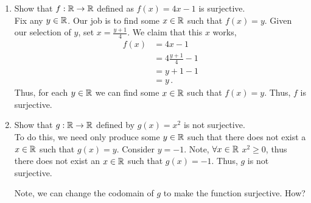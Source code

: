 \guard



\begin{exmp}
\label{exmp:easySurjectiveExamples}
  \begin{enumerate}
    \item Show that $f:\mathbb{R}\to\mathbb{R}$ defined as $f(x) = 4x-1$ is surjective.\\
    Fix any $y\in \mathbb{R}$.
    Our job is to find some $x\in\mathbb{R}$ such that $f(x)=y$.
    Given our selection of $y$, set $x = \frac{y+1}{4}$.
    We claim that this $x$ works,
    \begin{align*}
      f(x)  &=  4x-1 \\
            &=  4\frac{y+1}{4} - 1 \\
            &=  y+1 - 1 \\
            &=  y\,.
    \end{align*}
    Thus, for each $y\in\mathbb{R}$ we can find some $x\in\mathbb{R}$ such that $f(x)=y$.
    Thus, $f$ is surjective.

    \item Show that $g:\mathbb{R}\to\mathbb{R}$ defined by $g(x)=x^2$ is not surjective.\\
    To do this, we need only produce some $y\in\mathbb{R}$ such that there does not exist a $x\in\mathbb{R}$ such that $g(x)=y$.
    Consider $y=-1$.
    Note, $\forall x\in\mathbb{R}$ $x^2\geq 0$, thus there does not exist an $x\in\mathbb{R}$ such that $g(x)=-1$.
    Thus, $g$ is not surjective.

    Note, we can change the codomain of $g$ to make the function surjective.
    How? 
  \end{enumerate}

\end{exmp}
